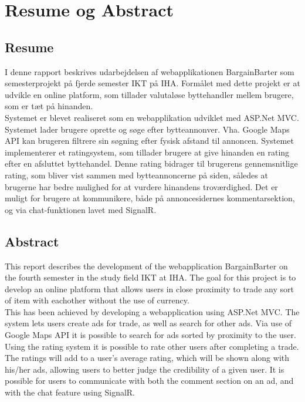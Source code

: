 \chapter{Resume og Abstract}

\section{Resume}
I denne rapport beskrives udarbejdelsen af webapplikationen BargainBarter som semesterprojekt på fjerde semester IKT på IHA. Formålet med dette projekt er at udvikle en online platform, som tillader valutaløse byttehandler mellem brugere, som er tæt på hinanden.
\\ Systemet er blevet realiseret som en webapplikation udviklet med ASP.Net MVC. Systemet lader brugere oprette og søge efter bytteannonver. Vha. Google Maps API kan brugeren filtrere sin søgning efter fysisk afstand til annoncen. Systemet implementerer et ratingsystem, som tillader brugere at give hinanden en rating efter en afsluttet byttehandel. Denne rating bidrager til brugerens gennemsnitlige rating, som bliver vist sammen med bytteannoncerne på siden, således at brugerne har bedre mulighed for at vurdere hinandens troværdighed. Det er muligt for brugere at kommunikere, både på annoncesidernes kommentarsektion, og via chat-funktionen lavet med SignalR.


\section{Abstract}
This report describes the development of the webapplication BargainBarter on the fourth semester in the study field IKT at IHA. The goal for this project is to develop an online platform that allows users in close proximity to trade any sort of item with eachother without the use of currency. 
\\This has been achieved by developing a webapplication using ASP.Net MVC. The system lets users create ads for trade, as well as search for other ads. Via use of Google Maps API it is possible to search for ads sorted by proximity to the user. Using the rating system it is possible to rate other users after completing a trade. The ratings will add to a user's average rating, which will be shown along with his/her ads, allowing users to better judge the credibility of a given user. It is possible for users to communicate with both the comment section on an ad, and with the chat feature using SignalR.



